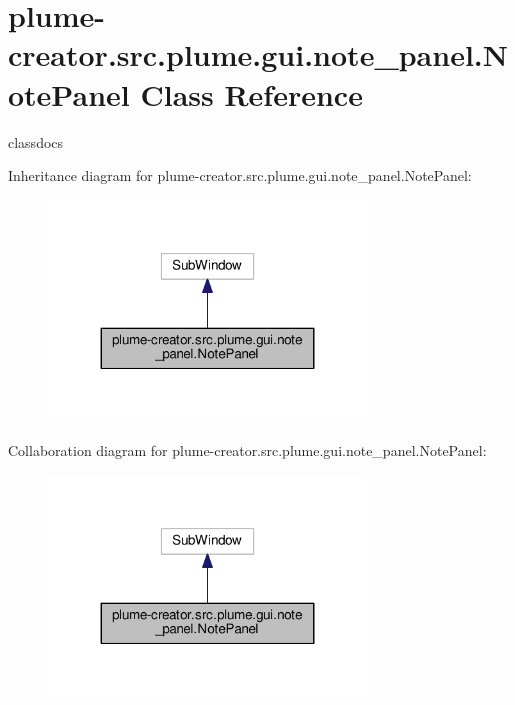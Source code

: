 \hypertarget{classplume-creator_1_1src_1_1plume_1_1gui_1_1note__panel_1_1_note_panel}{}\section{plume-\/creator.src.\+plume.\+gui.\+note\+\_\+panel.\+Note\+Panel Class Reference}
\label{classplume-creator_1_1src_1_1plume_1_1gui_1_1note__panel_1_1_note_panel}


classdocs  




Inheritance diagram for plume-\/creator.src.\+plume.\+gui.\+note\+\_\+panel.\+Note\+Panel\+:\nopagebreak
\begin{figure}[H]
\begin{center}
\leavevmode
\includegraphics[width=239pt]{classplume-creator_1_1src_1_1plume_1_1gui_1_1note__panel_1_1_note_panel__inherit__graph}
\end{center}
\end{figure}


Collaboration diagram for plume-\/creator.src.\+plume.\+gui.\+note\+\_\+panel.\+Note\+Panel\+:\nopagebreak
\begin{figure}[H]
\begin{center}
\leavevmode
\includegraphics[width=239pt]{classplume-creator_1_1src_1_1plume_1_1gui_1_1note__panel_1_1_note_panel__coll__graph}
\end{center}
\end{figure}
